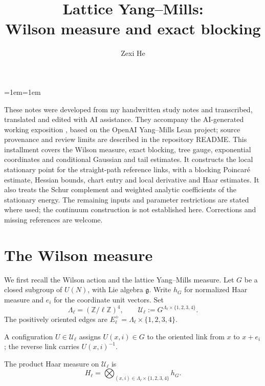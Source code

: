 \documentclass[10pt,reqno]{amsart}
\title[Lattice Yang--Mills: study notes]{Lattice Yang--Mills:\\Wilson measure and exact blocking}
\author{Zexi He}
\date{}
\theoremstyle{definition}
\theoremstyle{remark}
\numberwithin{equation}{section}
\numberwithin{figure}{section}
\newcommand{\g}{\mathfrak g}
\newcommand{\Z}{\mathbb Z}
\begin{document}
\maketitle
\begin{list}{}{\leftmargin=1em\rightmargin=1em\topsep=4pt\parsep=0pt}
\item[]\small
These notes were developed from my handwritten study notes and transcribed,
translated and edited with AI assistance. They accompany the AI-generated
working exposition \cite{Exposition}, based on the OpenAI Yang--Mills Lean
project; source provenance and review limits are described in the repository
README. This installment covers the Wilson measure, exact blocking, tree gauge,
exponential coordinates and conditional Gaussian and tail estimates. It
constructs the local stationary point for the straight-path reference
links, with a blocking Poincar\'e estimate, Hessian bounds, chart entry
and local derivative and Haar estimates. It also treats the Schur
complement and weighted analytic coefficients of the stationary energy.
The remaining inputs and parameter restrictions are stated where used;
the continuum construction is not established here. Corrections and missing references are welcome.
\end{list}

\tableofcontents
\medskip

\section{The Wilson measure}\label{sec:wilson}
We first recall the Wilson action and the lattice Yang--Mills measure.
Let $G$ be a closed subgroup of $U(N)$, with Lie algebra $\g$. Write $h_G$ for normalized Haar measure and $e_i$ for the coordinate unit vectors. Set
\begin{equation}\label{eq:display-001}
\Lambda_\ell=(\Z/\ell\Z)^4,
\qquad
\mathcal U_\ell:=G^{\Lambda_\ell\times\{1,2,3,4\}}.
\end{equation}
The positively oriented edges are $E_\ell^+=\Lambda_\ell\times\{1,2,3,4\}$.

A configuration $U\in\mathcal U_\ell$ assigns $U(x,i)\in G$ to the oriented link from $x$ to $x+e_i$;
the reverse link carries $U(x,i)^{-1}$.

The product Haar measure on $\mathcal U_\ell$ is
\begin{equation}\label{eq:display-002}
H_\ell=\bigotimes_{(x,i)\in\Lambda_\ell\times\{1,2,3,4\}}h_G.
\end{equation}
\end{document}
